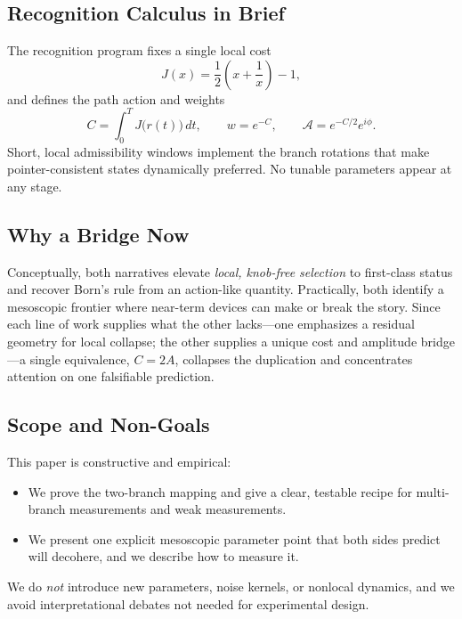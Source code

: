 \documentclass[11pt,letterpaper]{article}
\theoremstyle{definition}
\begin{document}
\subsection{Recognition Calculus in Brief}

The recognition program fixes a single local cost
\begin{equation}
J(x)=\frac{1}{2}\left(x+\frac{1}{x}\right)-1,
\end{equation}
and defines the path action and weights
\begin{equation}
C=\int_0^T J\bigl(r(t)\bigr)\,dt,\qquad w=e^{-C},\qquad \mathcal{A}=e^{-C/2}e^{i\phi}.
\end{equation}
Short, local admissibility windows implement the branch rotations that make pointer-consistent states dynamically preferred. No tunable parameters appear at any stage.

\subsection{Why a Bridge Now}

Conceptually, both narratives elevate \emph{local, knob-free selection} to first-class status and recover Born's rule from an action-like quantity. Practically, both identify a mesoscopic frontier where near-term devices can make or break the story. Since each line of work supplies what the other lacks---one emphasizes a residual geometry for local collapse; the other supplies a unique cost and amplitude bridge---a single equivalence, $C=2A$, collapses the duplication and concentrates attention on one falsifiable prediction.

\subsection{Scope and Non-Goals}

This paper is constructive and empirical:
\begin{itemize}
\item We prove the two-branch mapping and give a clear, testable recipe for multi-branch measurements and weak measurements.
\item We present one explicit mesoscopic parameter point that both sides predict will decohere, and we describe how to measure it.
\end{itemize}

We do \emph{not} introduce new parameters, noise kernels, or nonlocal dynamics, and we avoid interpretational debates not needed for experimental design.
\end{document}
